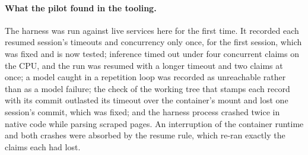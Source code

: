 \paragraph{What the pilot found in the tooling.} The harness was run
against live services here for the first time. It recorded each
resumed session's timeouts and concurrency only once, for the first
session, which was fixed and is now tested; inference timed out under
four concurrent claims on the CPU, and the run was resumed with a
longer timeout and two claims at once; a model caught in a repetition
loop was recorded as unreachable rather than as a model failure; the
check of the working tree that stamps each record with its commit
outlasted its timeout over the container's mount and lost one
session's commit, which was fixed; and the harness process crashed
twice in native code while parsing scraped pages. An interruption of
the container runtime and both crashes were absorbed by the resume
rule, which re-ran exactly the claims each had lost.
